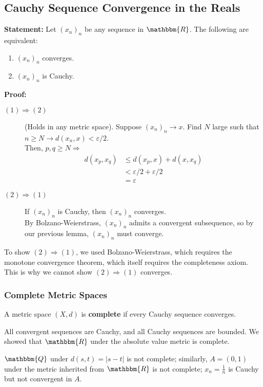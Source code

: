 \documentclass[10pt]{extarticle}
\newcommand{\Q}{\mathbbm{Q}}
\newcommand{\R}{\mathbbm{R}}
\begin{document}
  \subsection{Cauchy Sequence Convergence in the Reals}%
    \textbf{Statement:} Let $(x_n)_n$ be any sequence in $\R$. The following are equivalent:
    \begin{enumerate}[(1)]
      \item $(x_n)_n$ converges.
      \item $(x_n)_n$ is Cauchy.
    \end{enumerate}
    \textbf{Proof:}
    \begin{description}
      \item[$(1) \Rightarrow (2)$] (Holds in any metric space). Suppose $(x_n)_n \rightarrow x$. Find $N$ large such that $n\geq N \rightarrow d(x_n,x) < \varepsilon/2$.\\

        Then, $p,q\geq N \Rightarrow$
        \begin{align*}
          d(x_p,x_q) &\leq d(x_p,x) + d(x,x_q)\\
                     &< \varepsilon/2 + \varepsilon/2\\
                     &= \varepsilon
        \end{align*}
      \item[$(2)\Rightarrow(1)$] If $(x_n)_n$ is Cauchy, then $(x_n)_n$ converges.\\

        By Bolzano-Weierstrass, $(x_n)_n$ admits a convergent subsequence, so by our previous lemma, $(x_n)_n$ must converge.
    \end{description}
    \begin{description}
      \small
      \item[Note:] To show $(2) \Rightarrow (1)$, we used Bolzano-Weierstrass, which requires the monotone convergence theorem, which itself requires the completeness axiom. This is why we cannot show $(2) \Rightarrow (1)$ converges.
    \end{description}
  \subsubsection{Complete Metric Spaces}%
    A metric space $(X,d)$ is \textbf{complete} if every Cauchy sequence converges.
    \begin{description}
      \small
      \item[Remark:] All convergent sequences are Cauchy, and all Cauchy sequences are bounded. We showed that $\R$ under the absolute value metric is complete.
    \end{description}
    $\Q$ under $d(s,t) = |s-t|$ is not complete; similarly, $A = (0,1)$ under the metric inherited from $\R$ is not complete; $x_n = \frac{1}{n}$ is Cauchy but not convergent in $A$.
\end{document}
